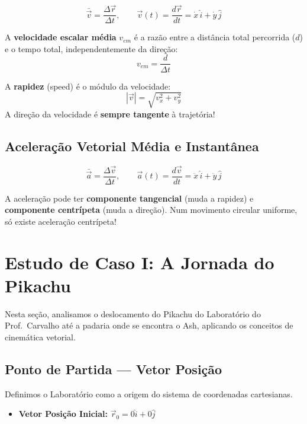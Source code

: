 \documentclass[10.5pt, a4paper]{extarticle}
\begin{document}
\[
  \bar{\vec{v}} = \frac{\Delta\vec{r}}{\Delta t}, \qquad
  \vec{v}(t) = \frac{d\vec{r}}{dt} = \dot{x}\,\hat{i} + \dot{y}\,\hat{j}
\]

A \textbf{velocidade escalar média} $v_{em}$ é a razão entre a distância total percorrida ($d$) e o tempo total, independentemente da direção:
\[
  v_{em} = \frac{d}{\Delta t}
\]

\begin{squirtlebox}
A \textbf{rapidez} (speed) é o módulo da velocidade:
\[
  |\vec{v}| = \sqrt{v_x^2 + v_y^2}
\]
A direção da velocidade é \textbf{sempre tangente} à trajetória!
\end{squirtlebox}

\subsection{Aceleração Vetorial Média e Instantânea}

\[
  \bar{\vec{a}} = \frac{\Delta\vec{v}}{\Delta t}, \qquad
  \vec{a}(t) = \frac{d\vec{v}}{dt} = \ddot{x}\,\hat{i} + \ddot{y}\,\hat{j}
\]

\begin{charmanderbox}
A aceleração pode ter \textbf{componente tangencial} (muda a rapidez) e \textbf{componente centrípeta} (muda a direção). Num movimento circular uniforme, só existe aceleração centrípeta!
\end{charmanderbox}

\section{Estudo de Caso I: A Jornada do Pikachu}

Nesta seção, analisamos o deslocamento do Pikachu do Laboratório do Prof.\ Carvalho até a padaria onde se encontra o Ash, aplicando os conceitos de cinemática vetorial.

\subsection{Ponto de Partida — Vetor Posição}

Definimos o Laboratório como a origem do sistema de coordenadas cartesianas.
\begin{itemize}[nosep]
  \item \textbf{Vetor Posição Inicial:} $\vec{r}_0 = 0\hat{i} + 0\hat{j}$
\end{itemize}
\end{document}

